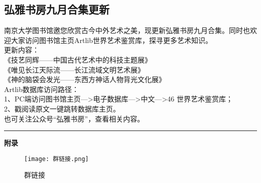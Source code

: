 \documentclass[letterpaper, 12pt]{article}
\begin{document}
\begin{multicols}{2}
\section{弘雅书房九月合集更新}
南京大学图书馆邀您欣赏古今中外艺术之美，现更新弘雅书房九月合集。同时也欢迎大家访问图书馆主页Artlib世界艺术鉴赏库，探寻更多艺术知识。\\
更新内容：\\
《技艺同辉——中国古代艺术中的科技主题展》\\
《唯见长江天际流——长江流域文明艺术展》\\
《神的脑袋会发光——东西方神话人物背光文化展》\\
Artlib数据库访问路径：\\
1、PC端访问图书馆主页—>电子数据库—>中文—>46 世界艺术鉴赏库；\\
2、戳阅读原文一键跳转数据库主页。\\
也可关注公众号“弘雅书房”，查看相关内容。\\
\end{multicols} 


\hrule
\vspace{4mm}
\centerline{\huge\textbf{附录}}
\begin{figure}[htbp]
    \centering
    \begin{minipage}[b]{0.32\textwidth}
        \centering
        \texttt{[image: 群链接.png]}
        \caption{群链接}
    \end{minipage}

\end{figure}
\end{document}
